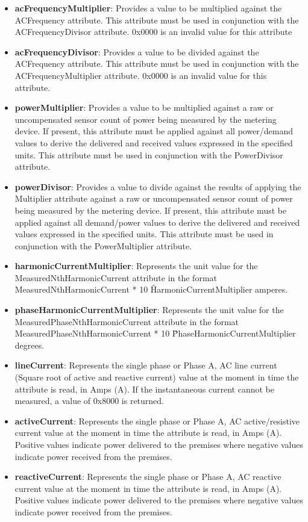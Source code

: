 \begin{itemize}
\item \textbf{acFrequencyMultiplier}: Provides a value to be multiplied against the ACFrequency attribute. This attribute must be used in conjunction with the ACFrequencyDivisor attribute. 0x0000 is an invalid value for this attribute
\item \textbf{acFrequencyDivisor}: Provides a value to be divided against the ACFrequency attribute. This attribute must be used in conjunction with the ACFrequencyMultiplier attribute. 0x0000 is an invalid value for this attribute.
\item \textbf{powerMultiplier}: Provides a value to be multiplied against a raw or uncompensated sensor count of power being measured by the metering device. If present, this attribute must be applied against all power/demand values to derive the delivered and received values expressed in the specified units. This attribute must be used in conjunction with the PowerDivisor attribute.
\item \textbf{powerDivisor}: Provides a value to divide against the results of applying the Multiplier attribute against a raw or uncompensated sensor count of power being measured by the metering device. If present, this attribute must be applied against all demand/power values to derive the delivered and received values expressed in the specified units. This attribute must be used in conjunction with the PowerMultiplier attribute.
\item \textbf{harmonicCurrentMultiplier}: Represents the unit value for the MeasuredNthHarmonicCurrent attribute in the format MeasuredNthHarmonicCurrent * 10 \^ HarmonicCurrentMultiplier amperes.
\item \textbf{phaseHarmonicCurrentMultiplier}: Represents the unit value for the MeasuredPhaseNthHarmonicCurrent attribute in the format MeasuredPhaseNthHarmonicCurrent * 10 \^ PhaseHarmonicCurrentMultiplier degrees.
\item \textbf{lineCurrent}: Represents the single phase or Phase A, AC line current (Square root of active and reactive current) value at the moment in time the attribute is read, in Amps (A). If the instantaneous current cannot be measured, a value of 0x8000 is returned.
\item \textbf{activeCurrent}: Represents the single phase or Phase A, AC active/resistive current value at the moment in time the attribute is read, in Amps (A). Positive values indicate power delivered to the premises where negative values indicate power received from the premises.
\item \textbf{reactiveCurrent}: Represents the single phase or Phase A, AC reactive current value at the moment in time the attribute is read, in Amps (A). Positive values indicate power delivered to the premises where negative values indicate power received from the premises.

\end{itemize}
